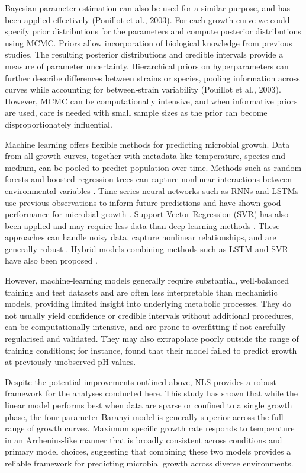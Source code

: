 \documentclass[11pt]{article}
\begin{document}
Bayesian parameter estimation can also be used for a similar purpose, and has been applied 
effectively (Pouillot et al., 2003). For each growth curve we could specify prior 
distributions for the parameters and compute posterior distributions using MCMC. Priors 
allow incorporation of biological knowledge from previous studies. The resulting posterior 
distributions and credible intervals provide a measure of parameter uncertainty. Hierarchical 
priors on hyperparameters can further describe differences between strains or species, 
pooling information across curves while accounting for between‑strain variability 
(Pouillot et al., 2003). However, MCMC can be computationally intensive, and when 
informative priors are used, care is needed with small sample sizes as the prior can become 
disproportionately influential.


Machine learning offers flexible methods for predicting microbial growth. Data from all 
growth curves, together with metadata like temperature, species and medium, can be 
pooled to predict population over time. Methods such as random forests and 
boosted regression trees can capture nonlinear interactions between environmental 
variables \citep{ndiokwere2026ml_bacterial_growth}. Time‑series neural networks such as 
RNNs and LSTMs use previous observations to inform future predictions and have shown good 
performance for microbial growth \citep{panagou2007application, saetae2025machine}. Support 
Vector Regression (SVR) has also been applied and may require less data than deep‑learning methods 
\citep{saetae2025machine}. These approaches can handle noisy data, capture nonlinear 
relationships, and are generally robust \citep{panagou2007application}. Hybrid models 
combining methods such as LSTM and SVR have also been proposed \citep{saetae2025machine}.

However, machine‑learning models generally require substantial, well‑balanced training and 
test datasets and are often less interpretable than mechanistic models, providing limited 
insight into underlying metabolic processes. They do not usually yield confidence or credible 
intervals without additional procedures, can be computationally intensive, and are prone to 
overfitting if not carefully regularised and validated. They may also extrapolate poorly 
outside the range of training conditions; for instance, \citet{ndiokwere2026ml_bacterial_growth} 
found that their model failed to predict growth at previously unobserved pH values.

Despite the potential improvements outlined above, NLS provides a robust framework for the 
analyses conducted here. This study has shown that while the linear model performs best when 
data are sparse or confined to a single growth phase, the four-parameter Baranyi model is 
generally superior across the full range of growth curves. Maximum specific growth rate 
responds to temperature in an Arrhenius-like manner that is broadly consistent across 
conditions and primary model choices, suggesting that combining these two models provides a 
reliable framework for predicting microbial growth across diverse environments.
\newpage


\end{document}
